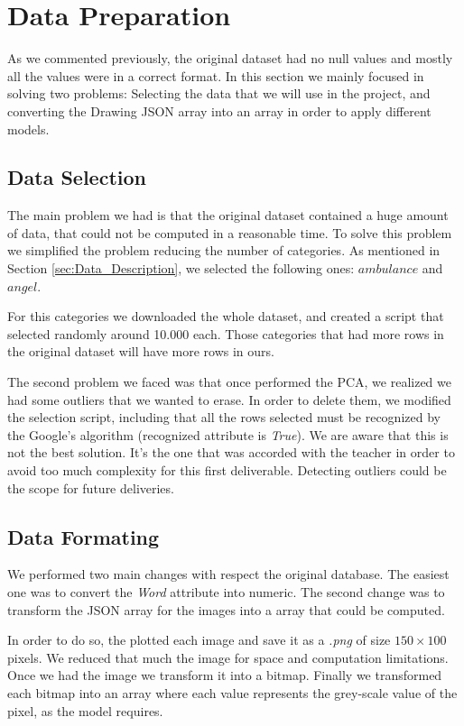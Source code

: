 \documentclass{article}
\begin{document}
\section{Data Preparation}
\label{sec:Data_Preparation}
As we commented previously, the original dataset had no null values and mostly all the values were in a correct format. In this section we mainly focused in solving two problems: Selecting the data that we will use in the project, and converting the Drawing JSON array into an array in order to apply different models.

\subsection{Data Selection}
\label{sec:Data_Selection}
The main problem we had is that the original dataset contained a huge amount of data, that could not be computed in a reasonable time. To solve this problem we simplified the problem reducing the number of categories. As mentioned  in Section \ref{sec:Data_Description}, we selected the following ones: $ambulance$ and $angel$.

For this categories we downloaded the whole dataset, and created a script that selected randomly around 10.000 each. Those categories that had more rows in the original dataset will have more rows in ours.

The second problem we faced was that once performed the PCA, we realized we had some outliers that we wanted to erase. In order to delete them, we modified the selection script, including that all the rows selected must be recognized by the Google's algorithm (recognized attribute is \textit{True}). We are aware that this is not the best solution. It's the one that was accorded with the teacher in order to avoid too much complexity for this first deliverable. Detecting outliers could be the scope for future deliveries.

\subsection{Data Formating}
\label{sec:Data_Formating}
We performed two main changes with respect the original database. The easiest one was to convert the \textit{Word} attribute into numeric. The second change was to transform the JSON array for the images into a array that could be computed.

In order to do so, the plotted each image and save it as a \textit{.png} of size $150 \times 100$ pixels. We reduced that much the image for space and computation limitations. Once we had the image we transform it into a bitmap. Finally we transformed each bitmap into an array where each value represents the grey-scale value of the pixel, as the model requires.
\end{document}
